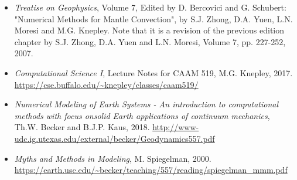
\begin{itemize} 
\item {\it Treatise on Geophysics}, Volume 7, Edited by D. Bercovici and G. Schubert: 
"Numerical Methods for Mantle Convection", by S.J. Zhong, D.A. Yuen, L.N. Moresi and M.G. Knepley. Note that it is a revision of the previous edition chapter by S.J. Zhong, D.A. Yuen and L.N. Moresi, Volume 7, pp. 227-252, 2007.

\item {\it Computational Science I}, Lecture Notes for CAAM 519, M.G. Knepley, 2017.
\url{https://cse.buffalo.edu/~knepley/classes/caam519/}

\item {\it Numerical Modeling of Earth Systems - An introduction to computational methods with focus onsolid Earth applications of continuum mechanics}, Th.W. Becker and B.J.P. Kaus, 2018.
\url{http://www-udc.ig.utexas.edu/external/becker/Geodynamics557.pdf}

\item {\it Myths and Methods in Modeling}, M. Spiegelman, 2000.
\url{https://earth.usc.edu/~becker/teaching/557/reading/spiegelman_mmm.pdf}

\end{itemize}
